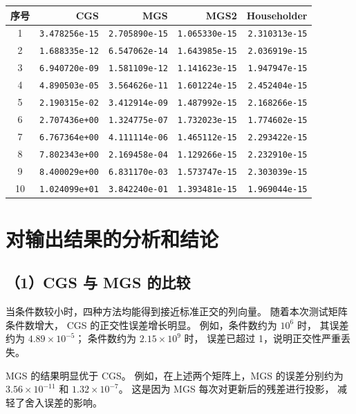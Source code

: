\documentclass[UTF8,a4paper,11pt,fontset=fandol]{ctexart}
\begin{document}
\begin{center}
\small
\setlength{\tabcolsep}{5pt}
\begin{tabular}{crrrr}
\toprule
序号 & CGS & MGS & MGS2 & Householder\\
\midrule
1
& \texttt{3.478256e-15}
& \texttt{2.705890e-15}
& \texttt{1.065330e-15}
& \texttt{2.310313e-15}\\
2
& \texttt{1.688335e-12}
& \texttt{6.547062e-14}
& \texttt{1.643985e-15}
& \texttt{2.036919e-15}\\
3
& \texttt{6.940720e-09}
& \texttt{1.581109e-12}
& \texttt{1.141623e-15}
& \texttt{1.947947e-15}\\
4
& \texttt{4.890503e-05}
& \texttt{3.564626e-11}
& \texttt{1.601224e-15}
& \texttt{2.452404e-15}\\
5
& \texttt{2.190315e-02}
& \texttt{3.412914e-09}
& \texttt{1.487992e-15}
& \texttt{2.168266e-15}\\
6
& \texttt{2.707436e+00}
& \texttt{1.324775e-07}
& \texttt{1.732023e-15}
& \texttt{1.774602e-15}\\
7
& \texttt{6.767364e+00}
& \texttt{4.111114e-06}
& \texttt{1.465112e-15}
& \texttt{2.293422e-15}\\
8
& \texttt{7.802343e+00}
& \texttt{2.169458e-04}
& \texttt{1.129266e-15}
& \texttt{2.232910e-15}\\
9
& \texttt{8.400029e+00}
& \texttt{6.831170e-03}
& \texttt{1.573747e-15}
& \texttt{2.303039e-15}\\
10
& \texttt{1.024099e+01}
& \texttt{3.842240e-01}
& \texttt{1.393481e-15}
& \texttt{1.969044e-15}\\
\bottomrule
\end{tabular}
\end{center}

\section{对输出结果的分析和结论}

\subsection*{（1）CGS 与 MGS 的比较}

当条件数较小时，四种方法均能得到接近标准正交的列向量。
随着本次测试矩阵条件数增大，
CGS 的正交性误差增长明显。
例如，条件数约为 $10^6$ 时，
其误差约为 $4.89\times10^{-5}$；
条件数约为 $2.15\times10^9$ 时，
误差已超过 1，说明正交性严重丢失。

MGS 的结果明显优于 CGS。
例如，在上述两个矩阵上，MGS 的误差分别约为
$3.56\times10^{-11}$ 和 $1.32\times10^{-7}$。
这是因为 MGS 每次对更新后的残差进行投影，
减轻了舍入误差的影响。
\end{document}
